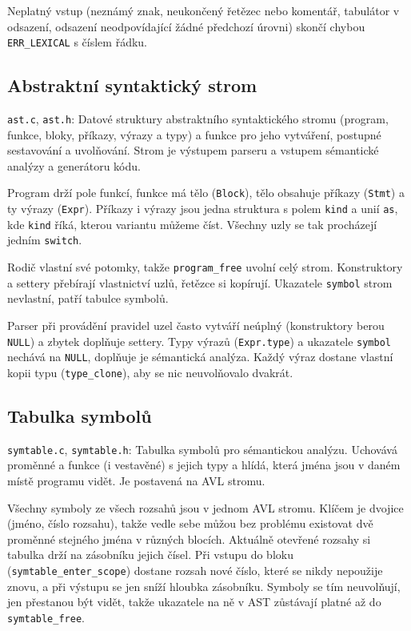\documentclass[11pt, a4paper]{article}
\begin{document}
Neplatný vstup (neznámý znak, neukončený řetězec nebo komentář, tabulátor v odsazení, odsazení neodpovídající žádné předchozí úrovni) skončí chybou \texttt{ERR\_LEXICAL} s číslem řádku.

\subsection{Abstraktní syntaktický strom}

\texttt{ast.c}, \texttt{ast.h}: Datové struktury abstraktního syntaktického stromu (program, funkce, bloky, příkazy, výrazy a typy) a funkce pro jeho vytváření, postupné sestavování a uvolňování. Strom je výstupem parseru a vstupem sémantické analýzy a generátoru kódu.

Program drží pole funkcí, funkce má tělo (\texttt{Block}), tělo obsahuje příkazy (\texttt{Stmt}) a ty výrazy (\texttt{Expr}). Příkazy i výrazy jsou jedna struktura s polem \texttt{kind} a unií \texttt{as}, kde \texttt{kind} říká, kterou variantu můžeme číst. Všechny uzly se tak procházejí jedním \texttt{switch}.

Rodič vlastní své potomky, takže \texttt{program\_free} uvolní celý strom. Konstruktory a settery přebírají vlastnictví uzlů, řetězce si kopírují. Ukazatele \texttt{symbol} strom nevlastní, patří tabulce symbolů.

Parser při provádění pravidel uzel často vytváří neúplný (konstruktory berou \texttt{NULL}) a zbytek doplňuje settery. Typy výrazů (\texttt{Expr.type}) a ukazatele \texttt{symbol} nechává na \texttt{NULL}, doplňuje je sémantická analýza. Každý výraz dostane vlastní kopii typu (\texttt{type\_clone}), aby se nic neuvolňovalo dvakrát.

\subsection{Tabulka symbolů}

\texttt{symtable.c}, \texttt{symtable.h}: Tabulka symbolů pro sémantickou analýzu. Uchovává proměnné a funkce (i vestavěné) s jejich typy a hlídá, která jména jsou v daném místě programu vidět. Je postavená na AVL stromu.

Všechny symboly ze všech rozsahů jsou v jednom AVL stromu. Klíčem je dvojice (jméno, číslo rozsahu), takže vedle sebe můžou bez problému existovat dvě proměnné stejného jména v různých blocích. Aktuálně otevřené rozsahy si tabulka drží na zásobníku jejich čísel. Při vstupu do bloku (\texttt{symtable\_enter\_scope}) dostane rozsah nové číslo, které se nikdy nepoužije znovu, a při výstupu se jen sníží hloubka zásobníku. Symboly se tím neuvolňují, jen přestanou být vidět, takže ukazatele na ně v AST zůstávají platné až do \texttt{symtable\_free}.
\end{document}
